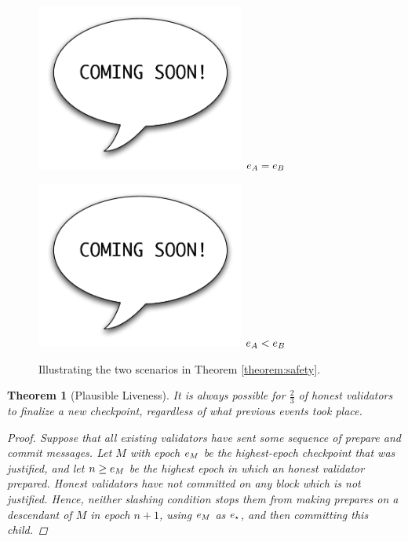 \documentclass[12pt, final]{article}
\newtheorem{theorem}{Theorem}
\newcommand{\epoch}{\ensuremath{e}\space}
\newcommand{\epochsource}{\ensuremath{\epoch_{\star}}\space}
\begin{document}
\begin{figure}[h!tb]
\centering
   \begin{minipage}[b]{0.48\textwidth}
    \includegraphics[width=2.7in]{cs.pdf}
    \centering
    $\epoch_A = \epoch_B$
   \end{minipage}
   \begin{minipage}[b]{0.48\textwidth}
    \includegraphics[width=2.7in]{cs.pdf}
    \centering
    $\epoch_A < \epoch_B$
   \end{minipage}
\label{fig:conflicting_checkpoints}
\caption{Illustrating the two scenarios in Theorem \ref{theorem:safety}.}
\end{figure}

\begin{theorem}[Plausible Liveness]
\label{theorem:liveness}
It is always possible for $\frac{2}{3}$ of honest validators to finalize a new checkpoint, regardless of what previous events took place.

\begin{proof}
Suppose that all existing validators have sent some sequence of prepare and commit messages. Let $M$ with epoch $\epoch_M$ be the highest-epoch checkpoint that was justified, and let $n \ge \epoch_M$ be the highest epoch in which an honest validator prepared. Honest validators have not committed on any block which is not justified. Hence, neither slashing condition stops them from making prepares on a descendant of $M$ in epoch $n+1$, using $\epoch_M$ as $\epochsource$, and then committing this child.
\end{proof}

\end{theorem}
\end{document}
